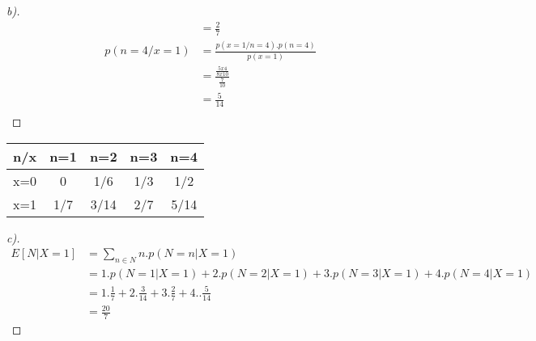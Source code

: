\documentclass[12pt]{article}
\newenvironment{theorem}[2][Theorem]{\begin{trivlist}
\item[\hskip \labelsep {\bfseries #1}\hskip \labelsep {\bfseries #2.}]}{\end{trivlist}}
\begin{document}
\begin{theorem}[Ans]{5}
\begin{proof}[b)]
\begin{align*}
&=\frac{2}{7}\\
p(n=4/x=1)&=\frac{p(x=1/n=4).p(n=4)}{p(x=1)}\\
&=\frac{\frac{5x4}{8x10}}{\frac{7}{10}}\\
&=\frac{5}{14}\\    
\end{align*}
\end{proof}
\begin{center}
 \begin{tabular}{|c c c c c|} 
 \hline
 n/x & n=1 & n=2 & n=3 & n=4\\ [0.5ex] 
 \hline\hline
 x=0 & 0 & 1/6 & 1/3 & 1/2\\ 
 \hline
 x=1 & 1/7 & 3/14 & 2/7 & 5/14 \\[1ex] 
 \hline
\end{tabular}
\end{center}
\begin{proof}[c)]
\begin{align*}
    E[N|X=1] &= \sum_{n\in N} n.p(N=n|X=1)\\
    &= 1.p(N=1|X=1)+2.p(N=2|X=1)+3.p(N=3|X=1)+4.p(N=4|X=1)\\
    &=1.\frac{1}{7}+2.\frac{3}{14}+3.\frac{2}{7}+4..\frac{5}{14}\\
    &=\frac{20}{7}
\end{align*}
\end{proof}
\end{theorem}
\pagebreak
\end{document}
